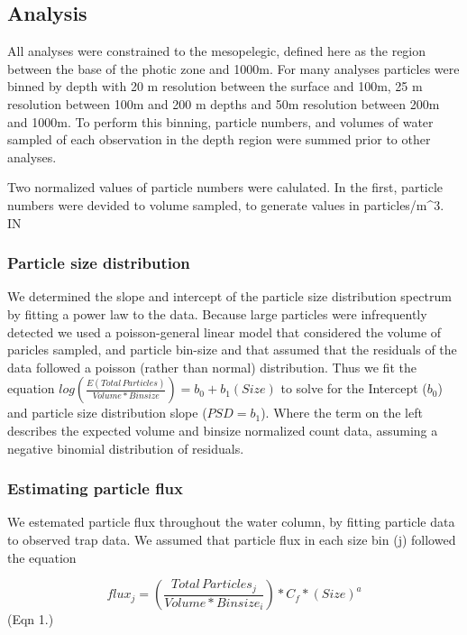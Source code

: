 \documentclass[]{article}
\begin{document}
\hypertarget{analysis}{%
\subsection{Analysis}\label{analysis}}

All analyses were constrained to the mesopelegic, defined here as the
region between the base of the photic zone and 1000m. For many analyses
particles were binned by depth with 20 m resolution between the surface
and 100m, 25 m resolution between 100m and 200 m depths and 50m
resolution between 200m and 1000m. To perform this binning, particle
numbers, and volumes of water sampled of each observation in the depth
region were summed prior to other analyses.

Two normalized values of particle numbers were calulated. In the first,
particle numbers were devided to volume sampled, to generate values in
particles/m\^{}3. IN

\hypertarget{particle-size-distribution}{%
\subsubsection{Particle size
distribution}\label{particle-size-distribution}}

We determined the slope and intercept of the particle size distribution
spectrum by fitting a power law to the data. Because large particles
were infrequently detected we used a poisson-general linear model that
considered the volume of paricles sampled, and particle bin-size and
that assumed that the residuals of the data followed a poisson (rather
than normal) distribution. Thus we fit the equation
\(log(\frac{E(Total\,Particles)}{Volume *Binsize}) = b_0 + b_1(Size)\)
to solve for the Intercept (\(b_0\)) and particle size distribution
slope (\(PSD = b_1\)). Where the term on the left describes the expected
volume and binsize normalized count data, assuming a negative binomial
distribution of residuals.

\hypertarget{estimating-particle-flux}{%
\subsubsection{Estimating particle
flux}\label{estimating-particle-flux}}

We estemated particle flux throughout the water column, by fitting
particle data to observed trap data. We assumed that particle flux in
each size bin (j) followed the equation

\[flux_j =  (\frac{Total\,Particles_j}{Volume * Binsize_i}) * C_f * (Size) ^ a\]
(Eqn 1.)
\end{document}
